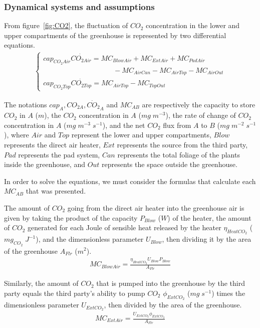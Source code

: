 \documentclass[a4paper]{article}
\begin{document}
\subsubsection{Dynamical systems and assumptions}
From figure~\ref{fig:CO2}, the fluctuation of \(CO_2\) concentration in the lower and upper compartments of the greenhouse is represented by two differential equations.
\begin{align}
  \begin{cases}
    cap_{CO_2Air}\dot{CO_{2Air}} = MC_{BlowAir} + MC_{ExtAir} + MC_{PadAir} \\ \qquad \qquad \qquad \qquad \qquad
    - MC_{AirCan} - MC_{AirTop} - MC_{AirOut}                               \\
    cap_{CO_2Top}\dot{CO_{2Top}} = MC_{AirTop} - MC_{TopOut}
  \end{cases}
\end{align}

The notations \(cap_A, CO_{2 A}, \dot{CO_2}_A\) and \(MC_{AB}\) are respectively the capacity to store \(CO_2\) in \(A\) (\(m\)), the \(CO_2\) concentration in \(A\) (\(mg\;m^{-3}\)), the rate of change of \(CO_2\) concentration in \(A\) (\(mg\;m^{-3}\;s^{-1}\)), and the net \(CO_2\) flux from \(A\) to \(B\) (\(mg\;m^{-2}\;s^{-1}\)), where \(Air\) and \(Top\) represent the lower and upper compartments, \(Blow\) represents the direct air heater, \(Ext\) represents the source from the third party, \(Pad\) represents the pad system, \(Can\) represents the total foliage of the plants inside the greenhouse, and \(Out\) represents the space outside the greenhouse.

In order to solve the equations, we must consider the formulas that calculate each \(MC_{AB}\) that was presented.

The amount of \(CO_2\) going from the direct air heater into the greenhouse air is given by taking the product of the capacity \(P_{Blow}\) (\(W\)) of the heater, the amount of \(CO_2\) generated for each Joule of sensible heat released by the heater \(\eta_{HeatCO_2}\) (\(mg_{CO_2}\;J^{-1}\)), and the dimensionless parameter \(U_{Blow}\), then dividing it by the area of the greenhouse \(A_{Flr}\) (\(m^2\)).
\begin{align}
  MC_{BlowAir} = \frac{\eta_{HeatCO_2}U_{Blow}P_{Blow}}{A_{Flr}}
\end{align}

Similarly, the amount of \(CO_2\) that is pumped into the greenhouse by the third party equals the third party's ability to pump \(CO_2\) \(\phi_{ExtCO_2}\) (\(mg\;s^{-1}\)) times the dimensionless parameter \(U_{ExtCO_2}\), then divided by the area of the greenhouse.
\begin{align}
  MC_{ExtAir} = \frac{U_{ExtCO_2}\phi_{ExtCO_2}}{A_{Flr}}
\end{align}
\end{document}
